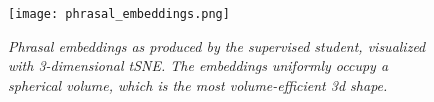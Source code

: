 \documentclass[a4paper,11pt]{article}
\begin{document}
\begin{figure}
\centering
\texttt{[image: phrasal\_embeddings.png]}
\caption{\textit{Phrasal embeddings as produced by the supervised student, visualized with 3-dimensional tSNE. The embeddings uniformly occupy a spherical volume, which is the most volume-efficient 3d shape.}}
\label{fig:phrasal}
\end{figure}
 

\end{document}
